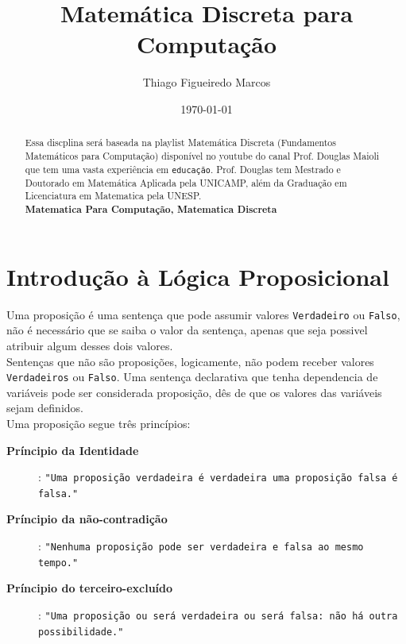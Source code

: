 \documentclass[12pt, onecolumn]{article}
\title{Matemática Discreta para Computação}
\author{Thiago Figueiredo Marcos}
\date{\today}
\begin{document}
	\maketitle
	
	\begin{abstract}
		
		Essa discplina será baseada na playlist Matemática Discreta
		(Fundamentos Matemáticos para Computação) disponível no youtube do canal 
		Prof. Douglas Maioli que tem uma vasta experiência em \texttt{educação}.
		Prof. Douglas tem Mestrado e Doutorado em Matemática Aplicada pela
		UNICAMP, além da Graduação em Licenciatura em Matematica pela UNESP. \\

		\textbf{Matematica Para Computação, Matematica Discreta}
	\end{abstract}


		\section{\centering Introdução à Lógica Proposicional}

	Uma proposição é uma sentença que pode assumir valores \texttt{Verdadeiro} 
	ou \texttt{Falso}, não é necessário que se saiba o valor da sentença, apenas
	que seja possivel atribuir algum desses dois valores. \\
	\newline
	Sentenças que não são proposições, logicamente, não podem receber valores
	\texttt{Verdadeiros} ou \texttt{Falso}. Uma sentença declarativa que tenha 
	dependencia de variáveis pode ser considerada proposição, dês de que os 
	valores das variáveis sejam definidos. \\
	\newline
	Uma proposição segue três princípios:
	\begin{description}
		\item [\textbf{Príncipio da Identidade}]: 
			\texttt{"Uma proposição verdadeira é verdadeira 
			uma proposição falsa é falsa."}
		\item [\textbf{Príncipio da não-contradição}]: 
			\texttt{"Nenhuma proposição pode ser verdadeira e 
			falsa ao mesmo tempo."}
		\item [\textbf{Príncipio do terceiro-excluído}]: 
			\texttt{"Uma proposição ou será verdadeira ou será falsa:
			não há outra possibilidade."}
	\end{description}
	
\end{document}
